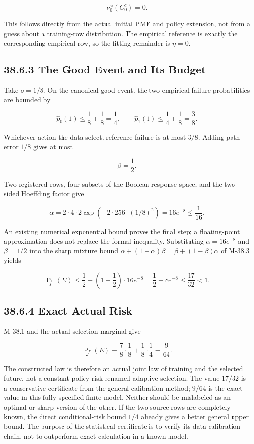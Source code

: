 \documentclass[
  english,
  11pt,
  oneside]{book}
\begin{document}
\[\nu_0^\omega(C_0^c)=0.\]

This follows directly from the actual initial PMF and policy extension, not from a guess about a training-row distribution. The empirical reference is exactly the corresponding empirical row, so the fitting remainder is \(\eta=0\).

\subsection{38.6.3 The Good Event and Its Budget}\label{the-good-event-and-its-budget}

Take \(\rho=1/8\). On the canonical good event, the two empirical failure probabilities are bounded by

\[\widehat p_0(1)\le\frac18+\frac18=\frac14,\qquad
\widehat p_1(1)\le\frac14+\frac18=\frac38.\]

Whichever action the data select, reference failure is at most \(3/8\). Adding path error \(1/8\) gives at most

\[\beta=\frac12.\]

Two registered rows, four subsets of the Boolean response space, and the two-sided Hoeffding factor give

\[\alpha
=2\cdot4\cdot2\exp\!\left(-2\cdot256\cdot(1/8)^2\right)
=16e^{-8}\le\frac1{16}.\]

An existing numerical exponential bound proves the final step; a floating-point approximation does not replace the formal inequality. Substituting \(\alpha=16e^{-8}\) and \(\beta=1/2\) into the sharp mixture bound \(\alpha+(1-\alpha)\beta=\beta+(1-\beta)\alpha\) of M-38.3 yields

\[\Pr_J(E)\le\frac12+\left(1-\frac12\right)\cdot16e^{-8}=\frac12+8e^{-8}\le\frac{17}{32}<1.\]

\subsection{38.6.4 Exact Actual Risk}\label{exact-actual-risk}

M-38.1 and the actual selection marginal give

\[\Pr_J(E)=
\frac78\cdot\frac18+\frac18\cdot\frac14
=\frac9{64}.\]

The constructed law is therefore an actual joint law of training and the selected future, not a constant-policy risk renamed adaptive selection. The value \(17/32\) is a conservative certificate from the general calibration method; \(9/64\) is the exact value in this fully specified finite model. Neither should be mislabeled as an optimal or sharp version of the other. If the two source rows are completely known, the direct conditional-risk bound \(1/4\) already gives a better general upper bound. The purpose of the statistical certificate is to verify its data-calibration chain, not to outperform exact calculation in a known model.
\end{document}
